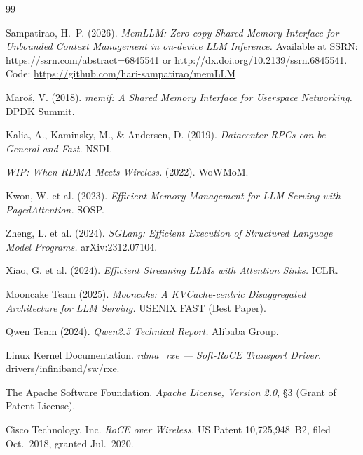 \documentclass[11pt]{article}
\begin{document}
\begin{thebibliography}{99}

 Sampatirao, H.~P. (2026). \emph{MemLLM: Zero-copy Shared Memory Interface for Unbounded Context Management in on-device LLM Inference.} Available at SSRN: \url{https://ssrn.com/abstract=6845541} or \url{http://dx.doi.org/10.2139/ssrn.6845541}. Code: \url{https://github.com/hari-sampatirao/memLLM}

 Maro\v{s}, V. (2018). \emph{memif: A Shared Memory Interface for Userspace Networking.} DPDK Summit.

 Kalia, A., Kaminsky, M., \& Andersen, D. (2019). \emph{Datacenter RPCs can be General and Fast.} NSDI.

 \emph{WIP: When RDMA Meets Wireless.} (2022). WoWMoM.

 Kwon, W. et al. (2023). \emph{Efficient Memory Management for LLM Serving with PagedAttention.} SOSP.

 Zheng, L. et al. (2024). \emph{SGLang: Efficient Execution of Structured Language Model Programs.} arXiv:2312.07104.

 Xiao, G. et al. (2024). \emph{Efficient Streaming LLMs with Attention Sinks.} ICLR.

 Mooncake Team (2025). \emph{Mooncake: A KVCache-centric Disaggregated Architecture for LLM Serving.} USENIX FAST (Best Paper).

 Qwen Team (2024). \emph{Qwen2.5 Technical Report.} Alibaba Group.

 Linux Kernel Documentation. \emph{rdma\_rxe --- Soft-RoCE Transport Driver.} drivers/infiniband/sw/rxe.

 The Apache Software Foundation. \emph{Apache License, Version 2.0}, \S3 (Grant of Patent License).

 Cisco Technology, Inc. \emph{RoCE over Wireless.} US Patent 10,725,948~B2, filed Oct.\ 2018, granted Jul.\ 2020.

\end{thebibliography}
\end{document}
